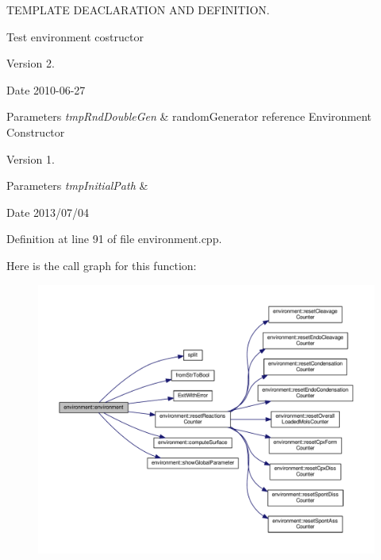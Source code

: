 T\-E\-M\-P\-L\-A\-T\-E D\-E\-A\-C\-L\-A\-R\-A\-T\-I\-O\-N A\-N\-D D\-E\-F\-I\-N\-I\-T\-I\-O\-N. 

Test environment costructor \begin{DoxyVersion}{Version}
2. 
\end{DoxyVersion}
\begin{DoxyDate}{Date}
2010-\/06-\/27 
\end{DoxyDate}

\begin{DoxyParams}{Parameters}
{\em tmp\-Rnd\-Double\-Gen} & random\-Generator reference Environment Constructor \\
\hline
\end{DoxyParams}
\begin{DoxyVersion}{Version}
1. 
\end{DoxyVersion}

\begin{DoxyParams}{Parameters}
{\em tmp\-Initial\-Path} & \\
\hline
\end{DoxyParams}
\begin{DoxyDate}{Date}
2013/07/04 
\end{DoxyDate}


Definition at line 91 of file environment.\-cpp.



Here is the call graph for this function\-:\nopagebreak
\begin{figure}[H]
\begin{center}
\leavevmode
\includegraphics[width=350pt]{a00011_aa44bbabec52bf2d61a19685a30e68de1_cgraph}
\end{center}
\end{figure}


